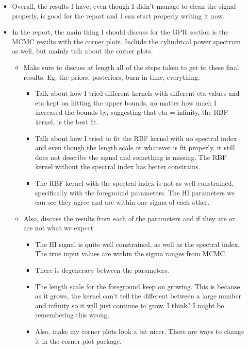 \begin{itemize}
\item Overall, the results I have,  even though I didn't manage to clean the signal properly, is good for the report and I can start properly writing it now.
\item In the report, the main thing I should discuss for the GPR section is the MCMC results with the corner plots. Include the cylindrical power spectrum as well, but mainly talk about the corner plots.
\begin{itemize}
    \item Make sure to discuss at length all of the steps taken to get to these final results. Eg. the priors, posteriors, burn in time, everything.
    \begin{itemize}
        \item Talk about how I tried different kernels with different eta values and eta kept on hitting the upper bounds, no matter how much I increased the bounds by, suggesting that eta = infinity, the RBF kernel, is the best fit. 
        \item Talk about how I tried to fit the RBF kernel with no spectral index and even though the length scale or whatever is fit properly, it still does not describe the signal and something is missing. The RBF kernel without the spectral index has better constrains.
        \item The RBF kernel with the spectral index is not as well constrained, specifically with the foreground parameters. The HI parameters we can see they agree and are within one sigma of each other. 
    \end{itemize}
    \item Also, discuss the results from each of the parameters and if they are or are not what we expect. 
    \begin{itemize}
        \item The HI signal is quite well constrained, as well as the spectral index. The true input values are within the sigma ranges from MCMC. 
        \item There is degeneracy between the parameters.
        \item The length scale for the foreground keep on growing. This is because as it grows, the kernel can't tell the different between a large number and infinity so it will just continue to grow. I think? I might be remembering this wrong.
        \item Also, make my corner plots look a bit nicer. There are ways to change it in the corner plot package. 
    \end{itemize}

\end{itemize}
\end{itemize}
